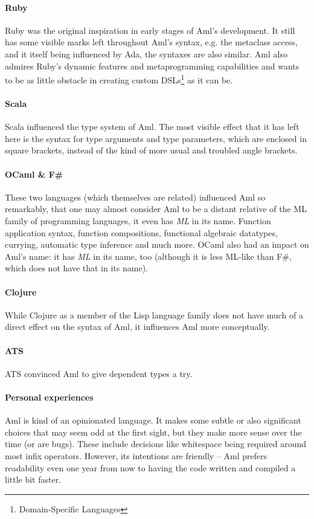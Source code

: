 \paragraph{Ruby}
Ruby was the original inspiration in early stages of Aml's development. It still has some visible marks left throughout Aml's syntax, e.g. the metaclass access, and it itself being influenced by Ada, the syntaxes are also similar. Aml also admires Ruby's dynamic features and metaprogramming capabilities and wants to be as little obstacle in creating custom DSLs\footnote{Domain-Specific Languages} as it can be. 

\paragraph{Scala}
Scala influenced the type system of Aml. The most visible effect that it has left here is the syntax for type arguments and type parameters, which are enclosed in square brackets, instead of the kind of more usual and troubled angle brackets. 

\paragraph{OCaml \& F\#}
These two languages (which themselves are related) influenced Aml so remarkably, that one may almost consider Aml to be a distant relative of the ML family of programming languages, it even has {\em ML} in its name. Function application syntax, function compositions, functional algebraic datatypes, currying, automatic type inference and much more. OCaml also had an impact on Aml's name: it has {\em ML} in its name, too (although it is less ML-like than F\#, which does not have that in its name). 

\paragraph{Clojure}
While Clojure as a member of the Lisp language family does not have much of a direct effect on the syntax of Aml, it influences Aml more conceptually. 

\paragraph{ATS}
ATS convinced Aml to give dependent types a try. 

\paragraph{Personal experiences}
Aml is kind of an opinionated language. It makes some subtle or also significant choices that may seem odd at the first sight, but they make more sense over the time (or are bugs). These include decisions like whitespace being required around most infix operators. However, its intentions are friendly -- Aml prefers readability even one year from now to having the code written and compiled a little bit faster. 





